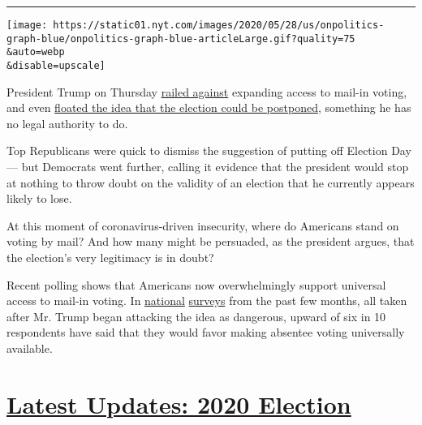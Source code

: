 \begin{center}\rule{0.5\linewidth}{\linethickness}\end{center}

\texttt{[image: https://static01.nyt.com/images/2020/05/28/us/onpolitics-graph-blue/onpolitics-graph-blue-articleLarge.gif?quality=75\\\&auto=webp\\\&disable=upscale]}

President Trump on Thursday
\href{https://twitter.com/realDonaldTrump/status/1288818160389558273}{railed
against} expanding access to mail-in voting, and even
\href{https://www.nytimes.com/2020/07/30/us/elections/biden-vs-trump.html}{floated
the idea that the election could be postponed}, something he has no
legal authority to do.

Top Republicans were quick to dismiss the suggestion of putting off
Election Day --- but Democrats went further, calling it evidence that
the president would stop at nothing to throw doubt on the validity of an
election that he currently appears likely to lose.

At this moment of coronavirus-driven insecurity, where do Americans
stand on voting by mail? And how many might be persuaded, as the
president argues, that the election's very legitimacy is in doubt?

Recent polling shows that Americans now overwhelmingly support universal
access to mail-in voting. In
\href{https://www.pewresearch.org/fact-tank/2020/07/20/as-covid-19-cases-increase-most-americans-support-no-excuse-absentee-voting/?utm_source=AdaptiveMailer\&utm_medium=email\&utm_campaign=20-07-20\%20Absentee\%20Voting\%20FT\%20HeadsUp\&org=982\&lvl=100\&ite=6671\&lea=1470843\&ctr=0\&par=1\&trk=}{national}
\href{https://www.foxnews.com/politics/fox-news-poll-biden-holds-lead-over-trump-as-coronavirus-concerns-grip-nation}{surveys}
from the past few months, all taken after Mr. Trump began attacking the
idea as dangerous, upward of six in 10 respondents have said that they
would favor making absentee voting universally available.

\hypertarget{latest-updates-2020-election}{%
\section{\texorpdfstring{\href{https://www.nytimes.com/2020/07/31/us/elections/biden-vs-trump.html?action=click\&pgtype=Article\&state=default\&region=MAIN_CONTENT_1\&context=storylines_live_updates}{Latest
Updates: 2020
Election}}{Latest Updates: 2020 Election}}\label{latest-updates-2020-election}}

